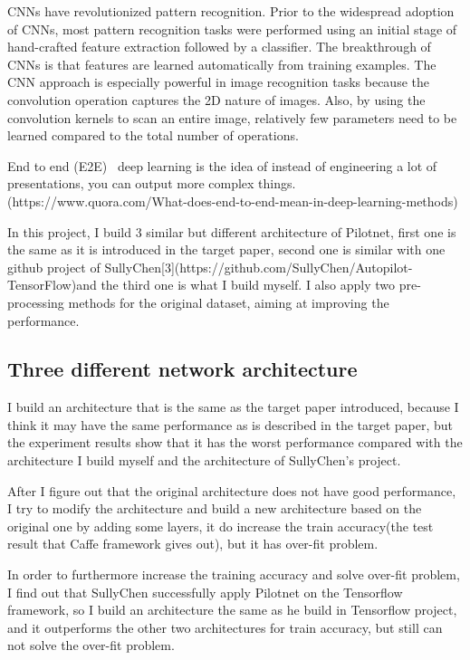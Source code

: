 \documentclass[10pt,twocolumn,letterpaper]{article}
\begin{document}
CNNs have revolutionized pattern recognition. Prior to the widespread adoption of CNNs, most pattern recognition tasks were performed using an initial stage of hand-crafted feature extraction followed by a classifier. The breakthrough of CNNs is that features are learned automatically from training examples. The CNN approach is especially powerful in image recognition tasks because the convolution operation captures the 2D nature of images. Also, by using the convolution kernels to scan an entire image, relatively few parameters need to be learned compared to the total number of operations.\par
End to end (E2E)~\cite{Authors14} deep learning is the idea of instead of engineering a lot of presentations, you can output more complex things.(https://www.quora.com/What-does-end-to-end-mean-in-deep-learning-methods)\par
In this project, I build 3 similar but different architecture of Pilotnet, first one is the same as it is introduced in the target paper, second one is similar with one github project of SullyChen[3](https://github.com/SullyChen/Autopilot-TensorFlow)and the third one is what I build myself. I also apply two pre-processing methods for the original dataset, aiming at improving the performance.


\subsection{Three different network architecture}

I build an architecture that is the same as the target paper introduced, because I think it may have the same performance as is described in the target paper, but the experiment results show that it has the worst performance compared with the architecture I build myself and the architecture of SullyChen's project. \par
After I figure out that the original architecture does not have good performance, I try to modify the architecture and build a new architecture based on the original one by adding some layers, it do increase the train accuracy(the test result that Caffe framework gives out), but it has over-fit problem. \par
In order to furthermore increase the training accuracy and solve over-fit problem, I find out that SullyChen successfully apply Pilotnet on the Tensorflow framework, so I build an architecture the same as he build in Tensorflow project, and it outperforms the other two architectures for train accuracy, but still can not solve the over-fit problem.
\end{document}
